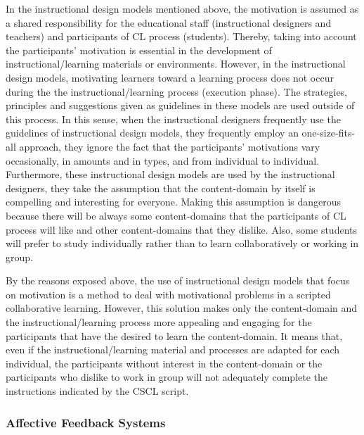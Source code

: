 In the instructional design models mentioned above, the motivation is assumed as a shared responsibility for the educational staff (instructional designers and teachers) and participants of CL process (students).
Thereby, taking into account the participants' motivation is essential in the development of instructional/learning materials or environments.
However, in the instructional design models, motivating learners toward a learning process does not occur during the the instructional/learning process (execution phase).
The strategies, principles and suggestions given as guidelines in these models are used outside of this process.
In this sense, when the instructional designers frequently use the guidelines of instructional design models, they frequently employ an one-size-fits-all approach, they ignore the fact that the participants' motivations vary occasionally, in amounts and in types, and from individual to individual.
Furthermore, these instructional design models are used by the instructional designers, they take the assumption that the content-domain by itself is compelling and interesting for everyone. 
Making this assumption is dangerous because there will be always some content-domains that the participants of CL process will like and other content-domains that they dislike.
Also, some students will prefer to study individually rather than to learn collaboratively or working in group.

By the reasons exposed above, the use of instructional design models that focus on motivation is a method to deal with motivational problems in a scripted collaborative learning.
However, this solution makes only the content-domain and the instructional/learning process more appealing and engaging for the participants that have the desired to learn the content-domain.
It means that, even if the instructional/learning material and processes are adapted for each individual, the participants without interest in the content-domain or the participants who dislike to work in group will not adequately complete the instructions indicated by the CSCL script. 

\subsubsection{Affective Feedback Systems}

